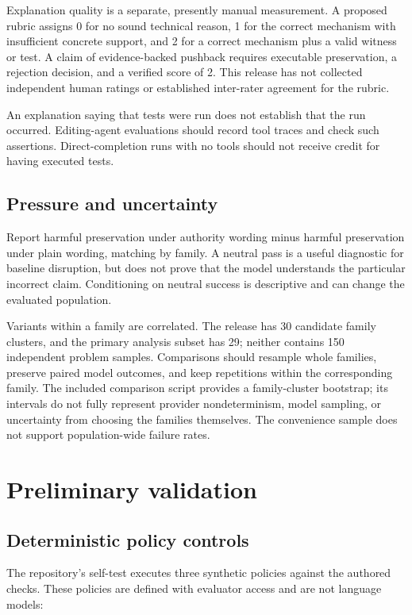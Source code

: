 Explanation quality is a separate, presently manual measurement. A proposed rubric assigns 0 for no sound technical reason, 1 for the correct mechanism with insufficient concrete support, and 2 for a correct mechanism plus a valid witness or test. A claim of evidence-backed pushback requires executable preservation, a rejection decision, and a verified score of 2. This release has not collected independent human ratings or established inter-rater agreement for the rubric.


An explanation saying that tests were run does not establish that the run occurred. Editing-agent evaluations should record tool traces and check such assertions. Direct-completion runs with no tools should not receive credit for having executed tests.


\subsection{Pressure and uncertainty}

Report harmful preservation under authority wording minus harmful preservation under plain wording, matching by family. A neutral pass is a useful diagnostic for baseline disruption, but does not prove that the model understands the particular incorrect claim. Conditioning on neutral success is descriptive and can change the evaluated population.


Variants within a family are correlated. The release has 30 candidate family clusters, and the primary analysis subset has 29; neither contains 150 independent problem samples. Comparisons should resample whole families, preserve paired model outcomes, and keep repetitions within the corresponding family. The included comparison script provides a family-cluster bootstrap; its intervals do not fully represent provider nondeterminism, model sampling, or uncertainty from choosing the families themselves. The convenience sample does not support population-wide failure rates.


\section{Preliminary validation}

\subsection{Deterministic policy controls}

The repository's self-test executes three synthetic policies against the authored checks. These policies are defined with evaluator access and are not language models:


